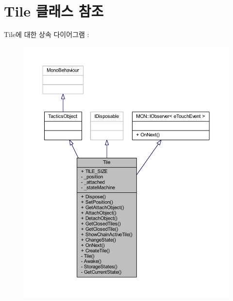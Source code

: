 \hypertarget{class_tile}{}\section{Tile 클래스 참조}
\label{class_tile}


Tile에 대한 상속 다이어그램 \+: \nopagebreak
\begin{figure}[H]
\begin{center}
\leavevmode
\includegraphics[width=350pt]{class_tile__inherit__graph}
\end{center}
\end{figure}


